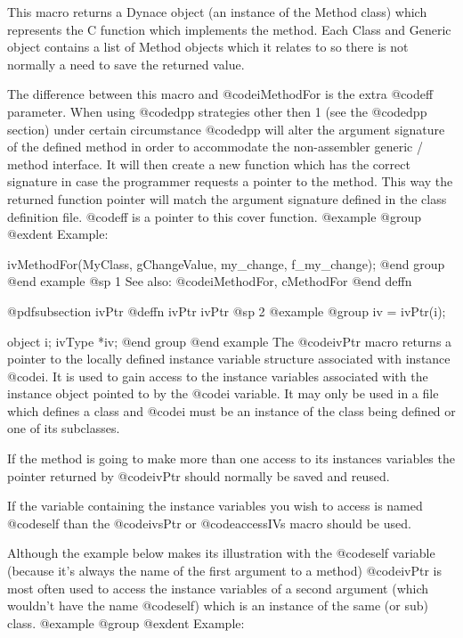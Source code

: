 {{{{This macro returns a Dynace object (an instance of the Method class) which
represents the C function which implements the method.  Each Class 
and Generic object contains a list of Method objects which it relates
to so there is not normally a need to save the returned value.

The difference between this macro and @code{iMethodFor} is the extra @code{ff}
parameter.  When using @code{dpp} strategies other then 1 (see the @code{dpp}
section) under certain circumstance @code{dpp} will alter the argument
signature of the defined method in order to accommodate the non-assembler
generic / method interface.  It will then create a new function which has
the correct signature in case the programmer requests a pointer to the
method.  This way the returned function pointer will match the argument
signature defined in the class definition file.  @code{ff} is a pointer
to this cover function.
@example
@group
@exdent Example:

ivMethodFor(MyClass, gChangeValue, my_change, f_my_change);
@end group
@end example
@sp 1
See also:  @code{iMethodFor, cMethodFor}
@end deffn
















@pdfsubsection {ivPtr}
@deffn {ivPtr} ivPtr
@sp 2
@example
@group
iv = ivPtr(i);

object  i;
ivType  *iv;
@end group
@end example
The @code{ivPtr} macro returns a pointer to the locally defined
instance variable structure associated with instance @code{i}.  It is
used to gain access to the instance variables associated with the
instance object pointed to by the @code{i} variable.  It may only be
used in a file which defines a class and @code{i} must be an instance
of the class being defined or one of its subclasses.

If the method is going to make more than one access to its instances
variables the pointer returned by @code{ivPtr} should normally be saved
and reused.

If the variable containing the instance variables you wish to access is
named @code{self} than the @code{ivsPtr} or @code{accessIVs} macro
should be used.

Although the example below makes its illustration with the @code{self}
variable (because it's always the name of the first argument to a
method) @code{ivPtr} is most often used to access the instance variables
of a second argument (which wouldn't have the name @code{self}) which is
an instance of the same (or sub) class.
@example
@group
@exdent Example:

}}}}
